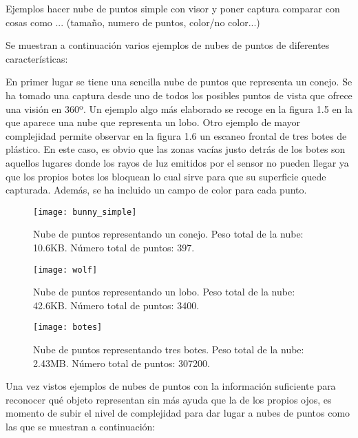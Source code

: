 Ejemplos
hacer nube de puntos simple con visor y poner captura
comparar con cosas como ... (tamaño, numero de puntos, color/no color...)


Se muestran a continuación varios ejemplos de nubes de puntos de diferentes características:

En primer lugar se tiene una sencilla nube de puntos que representa un conejo. Se ha tomado una captura desde uno de todos los posibles puntos de vista que ofrece una visión en 360º.
Un ejemplo algo más elaborado se recoge en la figura 1.5 en la que aparece una nube que representa un lobo. 
Otro ejemplo de mayor complejidad permite observar en la figura 1.6 un escaneo frontal de tres botes de plástico. En este caso, es obvio que las zonas vacías justo detrás de los botes son aquellos lugares donde los rayos de luz emitidos por el sensor no pueden llegar ya que los propios botes los bloquean lo cual sirve para que su superficie quede capturada. Además, se ha incluido un campo de color para cada punto.


\begin{figure}[!htb]
  \texttt{[image: bunny\_simple]}
  \caption{Nube de puntos representando un conejo.
  Peso total de la nube: 10.6KB.
  Número total de puntos: 397.}\label{fig:bunny_simple}
\endminipage\hfill
{}
  \texttt{[image: wolf]}
  \caption{Nube de puntos representando un lobo.
  Peso total de la nube: 42.6KB.
  Número total de puntos: 3400.}\label{fig:wolf}
\endminipage\hfill
{}%
  \texttt{[image: botes]}
  \caption{Nube de puntos representando tres botes.
  Peso total de la nube: 2.43MB.
  Número total de puntos: 307200.}\label{fig:botes}
\endminipage
\end{figure}



Una vez vistos ejemplos de nubes de puntos con la información suficiente para reconocer qué objeto representan sin más ayuda que la de los propios ojos, es momento de subir el nivel de complejidad para dar lugar a nubes de puntos como las que se muestran a continuación:

